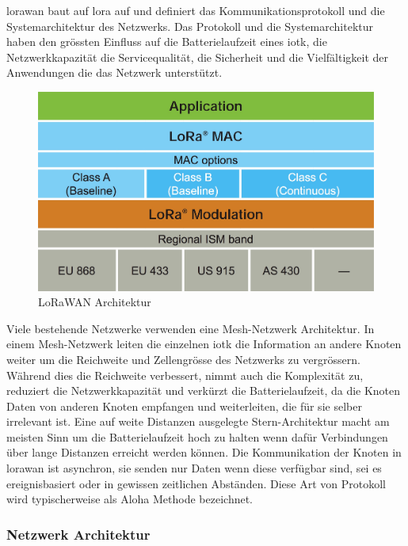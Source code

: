 \gls{lorawan} baut auf \gls{lora} auf und definiert das Kommunikationsprotokoll und die Systemarchitektur des Netzwerks. Das Protokoll und die Systemarchitektur haben den grössten Einfluss auf die Batterielaufzeit eines \gls{iotk}, die Netzwerkkapazität die Servicequalität, die Sicherheit und die Vielfältigkeit der Anwendungen die das Netzwerk unterstützt.

\begin{figure}[H]
     \centering
        \includegraphics[width=1.0\textwidth]{pictures/lorawan-architecture.jpg}
    \caption{LoRaWAN Architektur}
    \label{fig:LoRaWAN Architektur}
\end{figure}

Viele bestehende Netzwerke verwenden eine Mesh-Netzwerk Architektur. In einem Mesh-Netzwerk leiten die einzelnen \gls{iotk} die Information an andere Knoten weiter um die Reichweite und Zellengrösse des Netzwerks zu vergrössern. Während dies die Reichweite verbessert, nimmt auch die Komplexität zu, reduziert die Netzwerkkapazität und verkürzt die Batterielaufzeit, da die Knoten Daten von anderen Knoten empfangen und weiterleiten, die für sie selber irrelevant ist. Eine auf weite Distanzen ausgelegte Stern-Architektur macht am meisten Sinn um die Batterielaufzeit hoch zu halten wenn dafür Verbindungen über lange Distanzen erreicht werden können. Die Kommunikation der Knoten in \gls{lorawan} ist asynchron, sie senden nur Daten wenn diese verfügbar sind, sei es ereignisbasiert oder in gewissen zeitlichen Abständen. Diese Art von Protokoll wird typischerweise als Aloha Methode bezeichnet.

\subsubsection*{Netzwerk Architektur}

